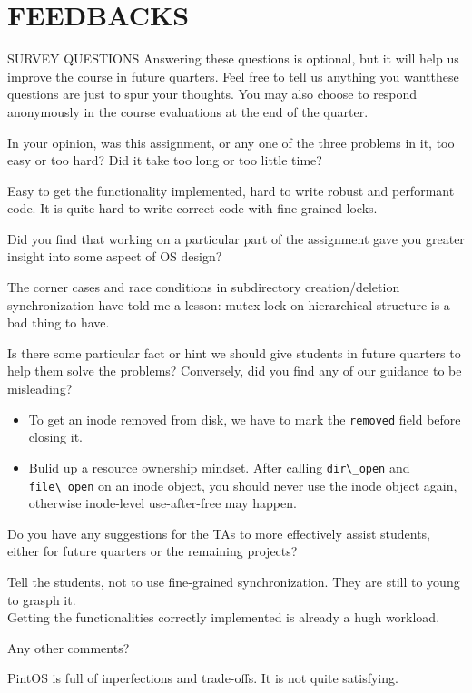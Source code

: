 \section*{FEEDBACKS}
\begin{aspect}{SURVEY QUESTIONS}
	Answering these questions is optional, but it will help us improve the course in future quarters.
	Feel free to tell us anything you wantthese questions are just to spur your thoughts.
	You may also choose to respond anonymously in the course evaluations at the end of the quarter.

	\begin{qc}
		In your opinion,
		was this assignment, or any one of the three problems in it, too easy or too hard?
		Did it take too long or too little time?
	\end{qc}
	Easy to get the functionality implemented,
	hard to write robust and performant code.
	It is quite hard to write correct code with fine-grained locks.\\

	\begin{qc}
		Did you find that working on a particular part of the assignment
		gave you greater insight into some aspect of OS design?
	\end{qc}
	The corner cases and race conditions in subdirectory creation/deletion synchronization
	have told me a lesson:
	mutex lock on hierarchical structure is a bad thing to have.

	\begin{qc}
		Is there some particular fact or hint we should give students in future quarters
		to help them solve the problems?
		Conversely, did you find any of our guidance to be misleading?
	\end{qc}
	\begin{itemize}
		\item To get an inode removed from disk, we have to mark the \lstinline{removed} field before closing it.\\
		\item Bulid up a resource ownership mindset.
		      After calling \lstinline{dir\_open} and \lstinline{file\_open} on an inode object,
		      you should never use the inode object again,
			  otherwise inode-level use-after-free may happen.
	\end{itemize}

	\begin{qc}
		Do you have any suggestions for the TAs to more effectively assist students,
		either for future quarters or the remaining projects?
	\end{qc}
	Tell the students, not to use fine-grained synchronization.
	They are still to young to grasph it.\\
	Getting the functionalities correctly implemented is already a hugh workload.

	\begin{qc}
		Any other comments?
	\end{qc}
	PintOS is full of inperfections and trade-offs. It is not quite satisfying.
\end{aspect}
